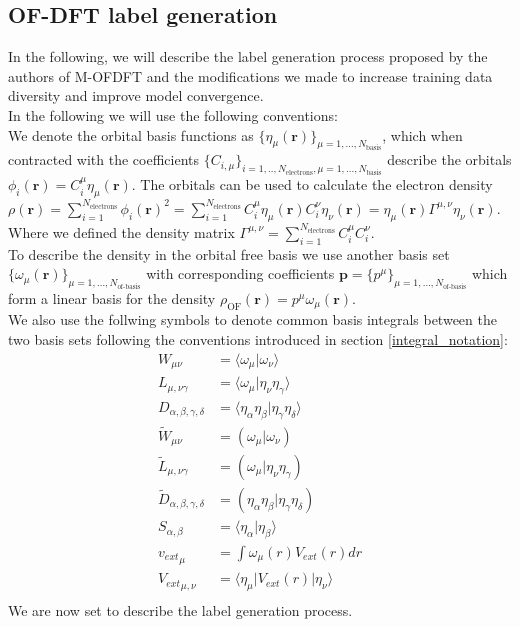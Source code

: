 \subsection{OF-DFT label generation}\label{ofdft_labelgen}
In the following, we will describe the label generation process proposed by the authors of M-OFDFT \cite{zhang_m-ofdft_2023} and the modifications we made to increase training data diversity and improve model convergence.\\
In the following we will use the following conventions:\\
We denote the orbital basis functions as $\{\eta_\mu(\mathbf{r})\}_{\mu=1,...,N_\text{basis}}$, which when contracted with the coefficients $\{C_{i,\mu}\}_{i=1,..,N_\text{electrons},\mu=1,...,N_\text{basis}}$ describe the orbitals $\phi_i(\mathbf{r}) = C_i^\mu \eta_\mu(\mathbf{r})$. The orbitals can be used to calculate the electron density $\rho(\mathbf{r}) = \sum_{i=1}^{N_\text{electrons}}\phi_i(\mathbf{r})^2=\sum_{i=1}^{N_\text{electrons}}C_i^\mu \eta_\mu(\mathbf{r})C_i^\nu \eta_\nu(\mathbf{r}) =  \eta_\mu(\mathbf{r})\Gamma^{\mu,\nu} \eta_\nu(\mathbf{r})$. Where we defined the density matrix $\Gamma^{\mu,\nu} = \sum_{i=1}^{N_\text{electrons}}C_i^\mu C_i^\nu$.\\
To describe the density in the orbital free basis we use another basis set $\{\omega_\mu(\mathbf{r})\}_{\mu=1,...,N_\text{of-basis}}$ with corresponding coefficients $\mathbf{p} =\{p^\mu\}_{\mu=1,...,N_\text{of-basis}}$ which form a linear basis for the density $\rho_\text{OF}(\mathbf{r}) = p^\mu \omega_\mu(\mathbf{r})$.\\
We also use the follwing symbols to denote common basis integrals between the two basis sets following the conventions introduced in section \ref{integral_notation}:
\begin{align}
    W_{\mu\nu} &= \langle\omega_\mu |\omega_\nu\rangle\\
    L_{\mu,\nu\gamma} &= \langle \omega_\mu |\eta_\nu\eta_\gamma\rangle\\
    D_{\alpha,\beta,\gamma,\delta}  &= \langle\eta_\alpha\eta_\beta|\eta_\gamma\eta_\delta\rangle\\
    \tilde{W}_{\mu\nu} &= (\omega_\mu |\omega_\nu)\\
    \tilde{L}_{\mu,\nu\gamma} &= (\omega_\mu |\eta_\nu\eta_\gamma)\\
    \tilde{D}_{\alpha,\beta,\gamma,\delta}  &= (\eta_\alpha\eta_\beta|\eta_\gamma\eta_\delta)\\
    S_{\alpha,\beta} &= \langle \eta_\alpha|\eta_\beta\rangle\\
    {v_{ext}}_\mu &= \int \omega_\mu (r) V_{ext} (r)dr\\
    {V_{ext}}_{\mu,\nu} &= \langle \eta_\mu | V_{ext} (r) | \eta_\nu \rangle\\
\end{align}
We are now set to describe the label generation process.\\
